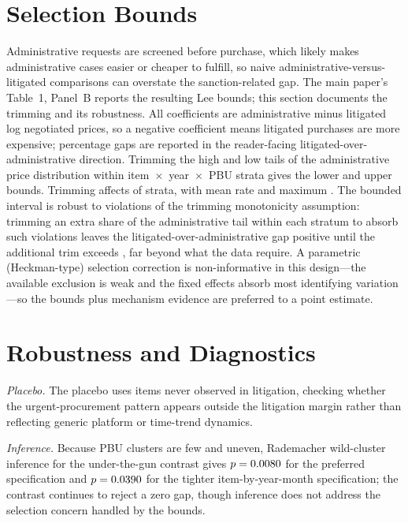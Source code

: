 \FloatBarrier

\section{Selection Bounds}
\label{app:selection_bounds}

Administrative requests are screened before purchase, which likely makes administrative cases easier or cheaper to fulfill, so naive administrative-versus-litigated comparisons can overstate the sanction-related gap. The main paper's Table~1, Panel~B reports the resulting Lee bounds; this section documents the trimming and its robustness. All coefficients are administrative minus litigated log negotiated prices, so a negative coefficient means litigated purchases are more expensive; percentage gaps are reported in the reader-facing litigated-over-administrative direction. Trimming the high and low tails of the administrative price distribution within item~$\times$~year~$\times$~PBU strata gives the lower and upper bounds. Trimming affects \BPutgLeeStrataExcess{} of \BPutgLeeStrataTotal{} strata, with mean rate \BPutgLeeTrimMean{} and maximum \BPutgLeeTrimMax{}. The bounded interval is robust to violations of the trimming monotonicity assumption: trimming an extra share of the administrative tail within each stratum to absorb such violations leaves the litigated-over-administrative gap positive until the additional trim exceeds \BPwfLeeBreakdownDelta{}, far beyond what the data require. A parametric (Heckman-type) selection correction is non-informative in this design---the available exclusion is weak and the fixed effects absorb most identifying variation---so the bounds plus mechanism evidence are preferred to a point estimate.



\FloatBarrier

\section{Robustness and Diagnostics}
\label{app:robustness}

\textit{Placebo.} The placebo uses items never observed in litigation, checking whether the urgent-procurement pattern appears outside the litigation margin rather than reflecting generic platform or time-trend dynamics.



\textit{Inference.} Because PBU clusters are few and uneven, Rademacher wild-cluster inference for the under-the-gun contrast gives $p=0.0080{}$ for the preferred specification and $p=0.0390{}$ for the tighter item-by-year-month specification; the contrast continues to reject a zero gap, though inference does not address the selection concern handled by the bounds.


